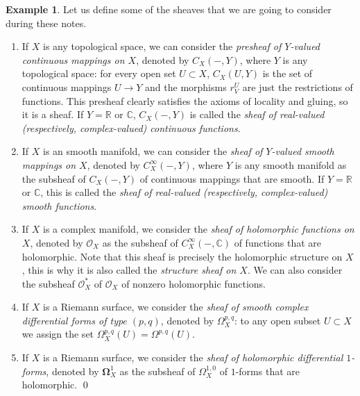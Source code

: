 \documentclass[12pt,a4paper]{book}
\theoremstyle{definition} \newtheorem{defn}[thm]{Definition}
\theoremstyle{definition} \newtheorem{ejemplo}[thm]{Example}
\theoremstyle{definition} \newtheorem{ejercicio}[thm]{Exercise}
\theoremstyle{remark} \newtheorem*{obs}{Remark}
\def\CC{\mathbb{C}}
\def\RR{\mathbb{R}}
\def\OO{\mathscr{O}}
\begin{document}
     \begin{ejemplo}
       Let us define some of the sheaves that we are going to consider during these notes. 
       \begin{enumerate}
	 \item If $X$ is any topological space, we can consider the \emph{presheaf of $Y$-valued continuous mappings on $X$}, denoted by $C_X(-,Y)$, where $Y$ is any topological space: for every open set $U\subset X$, $C_X(U,Y)$ is the set of continuous mappings $U\rightarrow Y$ and the morphisms $r^U_V$ are just the restrictions of functions. This presheaf clearly satisfies the axioms of locality and gluing, so it is a sheaf. If $Y=\RR$ or $\CC$, $C_X(-,Y)$ is called the \emph{sheaf of real-valued (respectively, complex-valued) continuous functions}.
	 \item If $X$ is an smooth manifold, we can consider the \emph{sheaf of $Y$-valued smooth mappings on $X$}, denoted by $C^\infty_X(-,Y)$, where $Y$ is any smooth manifold as the subsheaf of $C_X(-,Y)$ of continuous mappings that are smooth. If $Y=\RR$ or $\CC$, this is called the \emph{sheaf of real-valued (respectively, complex-valued) smooth functions}.
	 \item If $X$ is a complex manifold, we consider the \emph{sheaf of holomorphic functions on $X$}, denoted by $\OO_X$ as the subsheaf of $C^{\infty}_X(-,\CC)$ of functions that are holomorphic. Note that this sheaf is precisely the holomorphic structure on $X$, this is why it is also called the \emph{structure sheaf on $X$}. We can also consider the subsheaf $\OO_X^*$ of $\OO_X$ of nonzero holomorphic functions.
	 \item If $X$ is a Riemann surface, we consider the \emph{sheaf of smooth complex differential forms of type $(p,q)$}, denoted by $\Omega_X^{p,q}$: to any open subset $U\subset X$ we assign the set $\Omega_X^{p,q}(U)=\Omega^{p,q}(U)$.
	 \item If $X$ is a Riemann surface, we consider the \emph{sheaf of holomorphic differential $1$-forms}, denoted by $\boldsymbol{\Omega}^1_X$ as the subsheaf of $\Omega^{1,0}_X$ of $1$-forms that are holomorphic.
       \qed
       \end{enumerate}
     \end{ejemplo}
\end{document}

